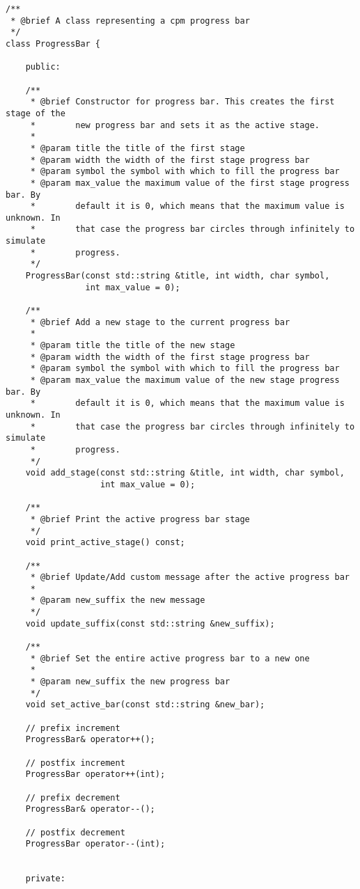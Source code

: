 \begin{lstlisting}[style=cpp,
				   caption=Класове за индикатор за напредък и етап,
				   label={lst:progress-bar}]
/**
 * @brief A class representing a cpm progress bar
 */
class ProgressBar {

	public:

	/**
	 * @brief Constructor for progress bar. This creates the first stage of the
	 *		  new progress bar and sets it as the active stage.
	 * 
	 * @param title the title of the first stage
	 * @param width the width of the first stage progress bar
	 * @param symbol the symbol with which to fill the progress bar
	 * @param max_value the maximum value of the first stage progress bar. By
	 * 		  default it is 0, which means that the maximum value is unknown. In
	 * 		  that case the progress bar circles through infinitely to simulate
	 * 		  progress.
	 */
	ProgressBar(const std::string &title, int width, char symbol,
				int max_value = 0);

	/**
	 * @brief Add a new stage to the current progress bar
	 * 
	 * @param title the title of the new stage
	 * @param width the width of the first stage progress bar
	 * @param symbol the symbol with which to fill the progress bar
	 * @param max_value the maximum value of the new stage progress bar. By
	 * 		  default it is 0, which means that the maximum value is unknown. In
	 * 		  that case the progress bar circles through infinitely to simulate
	 * 		  progress.
	 */
	void add_stage(const std::string &title, int width, char symbol,
				   int max_value = 0);

	/**
	 * @brief Print the active progress bar stage
	 */
	void print_active_stage() const;

	/**
	 * @brief Update/Add custom message after the active progress bar
	 * 
	 * @param new_suffix the new message
	 */
	void update_suffix(const std::string &new_suffix);

	/**
	 * @brief Set the entire active progress bar to a new one
	 * 
	 * @param new_suffix the new progress bar
	 */
	void set_active_bar(const std::string &new_bar);

	// prefix increment
	ProgressBar& operator++();

	// postfix increment
	ProgressBar operator++(int);

	// prefix decrement
	ProgressBar& operator--();

	// postfix decrement
	ProgressBar operator--(int);


	private:


\end{lstlisting}
